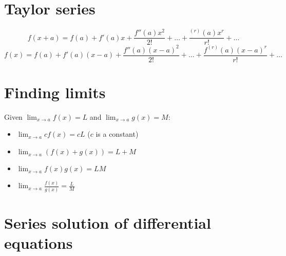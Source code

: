 \section{Taylor series}
$$f(x+a) = f(a)+f'(a)x + \frac{f''(a)x^2}{2!}+\dots+\frac{^{(r)}(a)x^r}{r!}+\dots$$
$$f(x)=f(a)+f'(a)(x-a)+\frac{f''(a)(x-a)^2}{2!}+\dots+\frac{f^{(r)}(a)(x-a)^r}{r!}+\dots$$

\section{Finding limits}
Given $\lim_{x\rightarrow a} f(x)=L$ and $\lim_{x\rightarrow a} g(x)=M$:
\begin{itemize}
    \item $\lim_{x\rightarrow a} cf(x)=cL$ ($c$ is a constant)
    \item $\lim_{x\rightarrow a} \left(f(x)+g(x)\right)=L+M$
    \item $\lim_{x\rightarrow a} f(x)g(x)=LM$
    \item $\lim_{x\rightarrow a} \frac{f(x)}{g(x)}=\frac{L}{M}$
\end{itemize}

\section{Series solution of differential equations}
